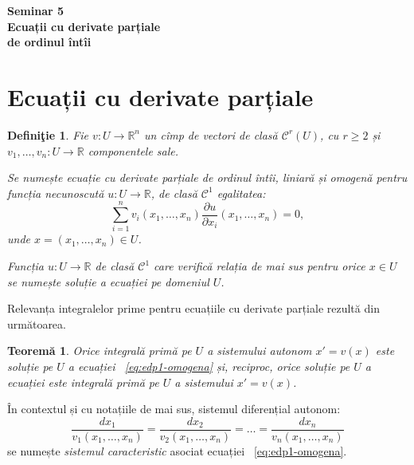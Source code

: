 \documentclass[11pt,a4paper]{article}
\newcommand\kal{\mathcal}
\newcommand\RR{\mathbb{R}}
\theoremstyle{dotless}
\newtheorem{theorem}{Teorem\u{a}}[section]
\theoremstyle{dotlessdr}
\newtheorem{definition}{Defini\c{t}ie}[section]
\begin{document}

\begin{center}
  {\large\textbf{Seminar 5 \\
      Ecuații cu derivate parțiale \\
      de ordinul întîi}}
\end{center}

\vspace{2cm}

\section{Ecuații cu derivate parțiale}

\begin{definition}\label{def:edp1-omogena}
  Fie $ v : U \to \RR^n $ un cîmp de vectori de clasă $ \kal{C}^r(U) $, cu
  $ r \geq 2 $ și $ v_1, \dots, v_n : U \to \RR $ componentele sale.

  Se numește \emph{ecuație cu derivate parțiale de ordinul întîi, liniară și omogenă}
  pentru funcția necunoscută $ u : U \to \RR $, de clasă $ \kal{C}^1 $ egalitatea:
  \begin{equation} \label{eq:edp1-omogena}
    \sum_{i = 1}^n v_i(x_1, \dots, x_n) \frac{\partial u}{\partial x_i}(x_1, \dots, x_n) = 0,
  \end{equation}
  unde $ x = (x_1, \dots, x_n) \in U $.

  Funcția $ u : U \to \RR $ de clasă $ \kal{C}^1 $ care verifică relația de mai sus pentru
  orice $ x \in U $ se numește \emph{soluție} a ecuației pe domeniul $ U $.
\end{definition}

Relevanța integralelor prime pentru ecuațiile cu derivate parțiale rezultă din următoarea.

\begin{theorem}\label{thm:int-prim-edp}
  Orice integrală primă pe $ U $ a sistemului autonom $ x' = v(x) $ este soluție pe $ U $
  a ecuației ~\eqref{eq:edp1-omogena} și, reciproc, orice soluție pe $ U $ a ecuației
  este integrală primă pe $ U $ a sistemului $ x' = v(x) $.
\end{theorem}

În contextul și cu notațiile de mai sus, sistemul diferențial autonom:
\[
  \frac{dx_1}{v_1(x_1, \dots, x_n)} = \frac{dx_2}{v_2(x_1, \dots, x_n)} = \dots = %
  \frac{dx_n}{v_n(x_1, \dots, x_n)}
\]
se numește \emph{sistemul caracteristic} asociat ecuației ~\eqref{eq:edp1-omogena}.
\end{document}
